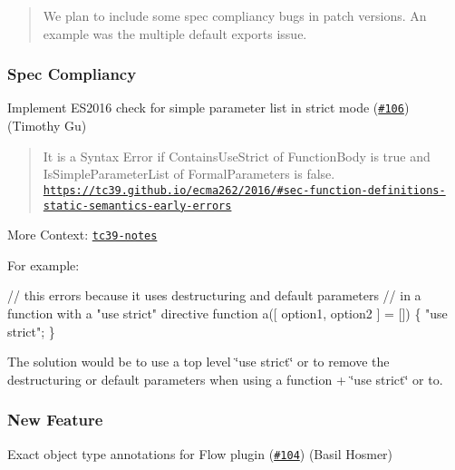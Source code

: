 \begin{quote}
We plan to include some spec compliancy bugs in patch versions. An example was the multiple default exports issue. \end{quote}


\subsubsection*{Spec Compliancy}


\begin{DoxyItemize}
\item Implement E\+S2016 check for simple parameter list in strict mode (\href{https://github.com/babel/babylon/pull/106}{\tt \#106}) (Timothy Gu)
\end{DoxyItemize}

\begin{quote}
It is a Syntax Error if Contains\+Use\+Strict of Function\+Body is true and Is\+Simple\+Parameter\+List of Formal\+Parameters is false. \href{https://tc39.github.io/ecma262/2016/#sec-function-definitions-static-semantics-early-errors}{\tt https\+://tc39.\+github.\+io/ecma262/2016/\#sec-\/function-\/definitions-\/static-\/semantics-\/early-\/errors} \end{quote}


More Context\+: \href{https://github.com/rwaldron/tc39-notes/blob/master/es7/2015-07/july-29.md#611-the-scope-of-use-strict-with-respect-to-destructuring-in-parameter-lists}{\tt tc39-\/notes}

For example\+:


\begin{DoxyCode}
// this errors because it uses destructuring and default parameters
// in a function with a "use strict" directive
function a([ option1, option2 ] = []) \{
  "use strict";
\}
\end{DoxyCode}


The solution would be to use a top level \char`\"{}use strict\char`\"{} or to remove the destructuring or default parameters when using a function + \char`\"{}use strict\char`\"{} or to.

\subsubsection*{New Feature}


\begin{DoxyItemize}
\item Exact object type annotations for Flow plugin (\href{https://github.com/babel/babylon/pull/104}{\tt \#104}) (Basil Hosmer)
\end{DoxyItemize}

